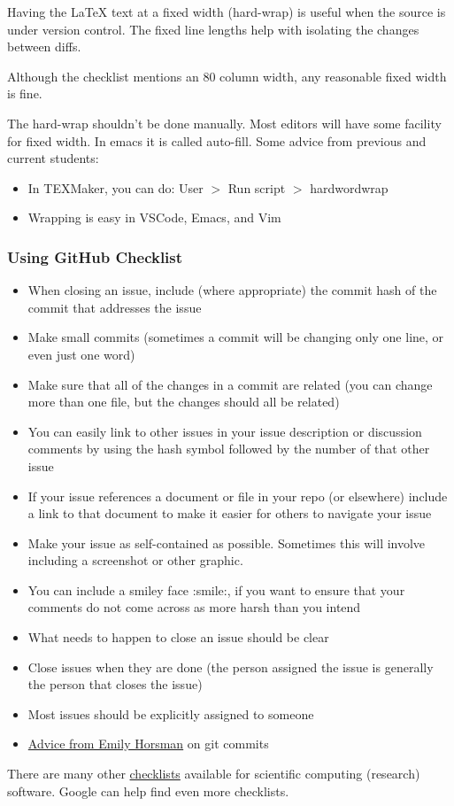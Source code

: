 \documentclass[12pt]{article}
\begin{document}
Having the \LaTeX{} text at a fixed width (hard-wrap) is useful when the source
is under version control. The fixed line lengths help with isolating the
changes between diffs.

Although the checklist mentions an 80 column width, any reasonable fixed width
is fine.

The hard-wrap shouldn't be done manually. Most editors will have some facility
for fixed width. In emacs it is called auto-fill. Some advice from previous and
current students:

\begin{itemize}
  \item In TEXMaker, you can do: User $>$ Run script $>$ hardwordwrap
  \item Wrapping is easy in VSCode, Emacs, and Vim
\end{itemize}

\subsubsection*{Using GitHub Checklist}

\begin{itemize}
  \item When closing an issue, include (where appropriate) the commit hash of the
        commit that addresses the issue
  \item Make small commits (sometimes a commit will be changing only one line, or even
        just one word)
  \item Make sure that all of the changes in a commit are related (you can change more
        than one file, but the changes should all be related)
  \item You can easily link to other issues in your issue description or discussion
        comments by using the hash symbol followed by the number of that other issue
  \item If your issue references a document or file in your repo (or elsewhere) include
        a link to that document to make it easier for others to navigate your issue
  \item Make your issue as self-contained as possible. Sometimes this will involve
        including a screenshot or other graphic.
  \item You can include a smiley face :smile:, if you want to ensure that your comments
        do not come across as more harsh than you intend
  \item What needs to happen to close an issue should be clear
  \item Close issues when they are done (the person assigned the issue is generally the
        person that closes the issue)
  \item Most issues should be explicitly assigned to someone
  \item
        \href{https://gitlab.cas.mcmaster.ca/smiths/se2aa4_cs2me3/-/blob/master/FAQ/GitAdvice.txt}
        {Advice from Emily Horsman} on git commits
\end{itemize}

There are many other
\href{https://gitlab.cas.mcmaster.ca/SEforSC/se4sc/-/wikis/Advice-and-Checklists-for-Repos-(including-a-list-of-recommended-artifacts)}{checklists}
available for scientific computing (research) software. Google can help find
even more checklists.
\end{document}
